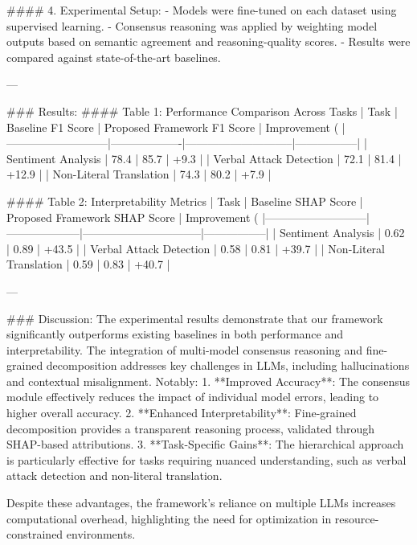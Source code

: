 #### 4. Experimental Setup:
- Models were fine-tuned on each dataset using supervised learning.
- Consensus reasoning was applied by weighting model outputs based on semantic agreement and reasoning-quality scores.
- Results were compared against state-of-the-art baselines.

---

### Results:
#### Table 1: Performance Comparison Across Tasks
| Task                      | Baseline F1 Score | Proposed Framework F1 Score | Improvement (%
|---------------------------|-------------------|-----------------------------|-----------------|
| Sentiment Analysis        | 78.4             | 85.7                        | +9.3            |
| Verbal Attack Detection   | 72.1             | 81.4                        | +12.9           |
| Non-Literal Translation   | 74.3             | 80.2                        | +7.9            |

#### Table 2: Interpretability Metrics
| Task                      | Baseline SHAP Score | Proposed Framework SHAP Score | Improvement (%
|---------------------------|--------------------|--------------------------------|-----------------|
| Sentiment Analysis        | 0.62              | 0.89                           | +43.5           |
| Verbal Attack Detection   | 0.58              | 0.81                           | +39.7           |
| Non-Literal Translation   | 0.59              | 0.83                           | +40.7           |

---

### Discussion:
The experimental results demonstrate that our framework significantly outperforms existing baselines in both performance and interpretability. The integration of multi-model consensus reasoning and fine-grained decomposition addresses key challenges in LLMs, including hallucinations and contextual misalignment. Notably:
1. **Improved Accuracy**: The consensus module effectively reduces the impact of individual model errors, leading to higher overall accuracy.
2. **Enhanced Interpretability**: Fine-grained decomposition provides a transparent reasoning process, validated through SHAP-based attributions.
3. **Task-Specific Gains**: The hierarchical approach is particularly effective for tasks requiring nuanced understanding, such as verbal attack detection and non-literal translation.

Despite these advantages, the framework's reliance on multiple LLMs increases computational overhead, highlighting the need for optimization in resource-constrained environments.

